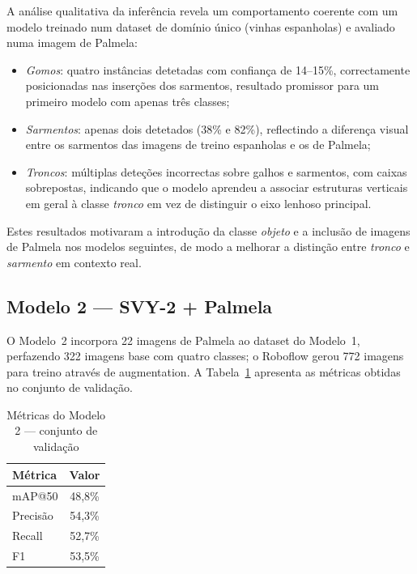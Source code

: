 \documentclass[12pt, a4paper]{article}
\begin{document}
A análise qualitativa da inferência revela um comportamento coerente com
um modelo treinado num dataset de domínio único (vinhas espanholas) e
avaliado numa imagem de Palmela:
\begin{itemize}[noitemsep]
  \item \textit{Gomos}: quatro instâncias detetadas com confiança de
    14--15\%, correctamente posicionadas nas inserções dos sarmentos,
    resultado promissor para um primeiro modelo com apenas três classes;
  \item \textit{Sarmentos}: apenas dois detetados (38\% e 82\%), reflectindo
    a diferença visual entre os sarmentos das imagens de treino espanholas
    e os de Palmela;
  \item \textit{Troncos}: múltiplas deteções incorrectas sobre galhos e
    sarmentos, com caixas sobrepostas, indicando que o modelo aprendeu
    a associar estruturas verticais em geral à classe \textit{tronco} em
    vez de distinguir o eixo lenhoso principal.
\end{itemize}

Estes resultados motivaram a introdução da classe \textit{objeto} e a
inclusão de imagens de Palmela nos modelos seguintes, de modo a melhorar
a distinção entre \textit{tronco} e \textit{sarmento} em contexto real.

\subsection{Modelo 2 — SVY-2 + Palmela}

O Modelo~2 incorpora 22 imagens de Palmela ao dataset do Modelo~1,
perfazendo 322 imagens base com quatro classes; o Roboflow gerou 772
imagens para treino através de augmentation. A Tabela~\ref{tab:resultados}
apresenta as métricas obtidas no conjunto de validação.

\begin{table}[H]
  \centering
  \caption{Métricas do Modelo 2 — conjunto de validação}
  \label{tab:resultados}
  \begin{tabular}{lc}
    \toprule
    \textbf{Métrica} & \textbf{Valor} \\
    \midrule
    mAP@50           & 48,8\% \\
    Precisão         & 54,3\% \\
    Recall           & 52,7\% \\
    F1               & 53,5\% \\
    \bottomrule
  \end{tabular}
\end{table}
\end{document}
